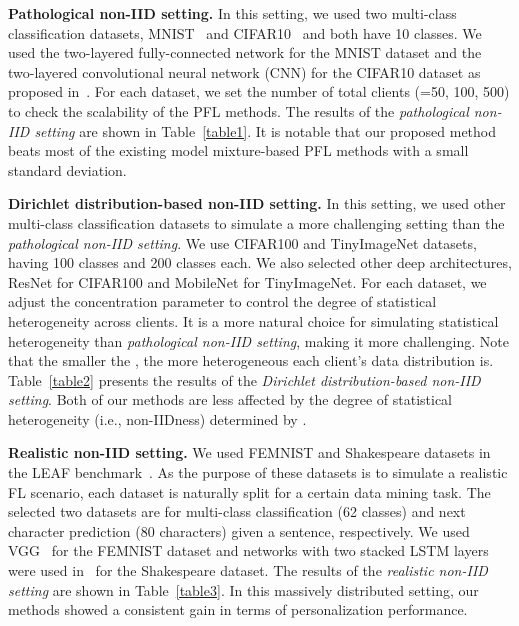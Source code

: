 \documentclass[sigconf]{acmart}
\begin{document}
\medskip 
\noindent\textbf{Pathological non-IID setting.} In this setting, we used two multi-class classification datasets, MNIST~\cite{mnist} and CIFAR10~\cite{cifar} and both have 10 classes. We used the two-layered fully-connected network for the MNIST dataset and the two-layered convolutional neural network (CNN) for the CIFAR10 dataset as proposed in~\cite{mc+17}. For each dataset, we set the number of total clients (=50, 100, 500) to check the scalability of the PFL methods. 
The results of the \textit{pathological non-IID setting} are shown in Table~\ref{table1}. It is notable that our proposed method beats most of the existing model mixture-based PFL methods with a small standard deviation.

\smallskip 
\noindent\textbf{Dirichlet distribution-based non-IID setting.} In this setting, we used other multi-class classification datasets to simulate a more challenging setting than the \textit{pathological non-IID setting}. We use CIFAR100\cite{cifar} and TinyImageNet\cite{tinyimagenet} datasets, having 100 classes and 200 classes each. We also selected other deep architectures, ResNet\cite{resnet} for CIFAR100 and MobileNet\cite{mobilenet} for TinyImageNet. For each dataset, we adjust the concentration parameter  to control the degree of statistical heterogeneity across clients. It is a more natural choice for simulating statistical heterogeneity than \textit{pathological non-IID setting}, making it more challenging. Note that the smaller the , the more heterogeneous each client's data distribution is. Table~\ref{table2} presents the results of the \textit{Dirichlet distribution-based non-IID setting}. Both of our methods are less affected by the degree of statistical heterogeneity (i.e., non-IIDness) determined by .

\medskip
\noindent\textbf{Realistic non-IID setting.} We used FEMNIST and Shakespeare datasets in the LEAF benchmark~\cite{leaf}. As the purpose of these datasets is to simulate a realistic FL scenario, each dataset is naturally split for a certain data mining task. The selected two datasets are for multi-class classification (62 classes) and next character prediction (80 characters) given a sentence, respectively. We used VGG~\cite{vgg} for the FEMNIST dataset and networks with two stacked LSTM layers were used in~\cite{mc+17} for the Shakespeare dataset. The results of the \textit{realistic non-IID setting} are shown in Table~\ref{table3}. In this massively distributed setting, our methods showed a consistent gain in terms of personalization performance.
\end{document}
